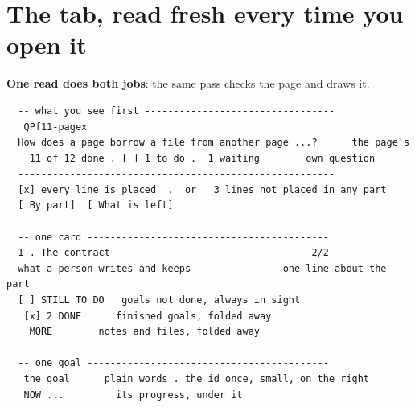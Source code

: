 \section{The tab, read fresh every time you open it}
\textbf{One read does both jobs}: the same pass checks the page and draws it.

\begin{verbatim}
  -- what you see first ---------------------------------
   QPf11-pagex
  How does a page borrow a file from another page ...?      the page's
    11 of 12 done . [ ] 1 to do .  1 waiting        own question
  -------------------------------------------------------
  [x] every line is placed  .  or   3 lines not placed in any part
  [ By part]  [ What is left]

  -- one card ------------------------------------------
  1 . The contract                                   2/2
  what a person writes and keeps                one line about the part
  [ ] STILL TO DO   goals not done, always in sight
   [x] 2 DONE      finished goals, folded away
    MORE        notes and files, folded away

  -- one goal ------------------------------------------
   the goal      plain words . the id once, small, on the right
   NOW ...         its progress, under it
\end{verbatim}
